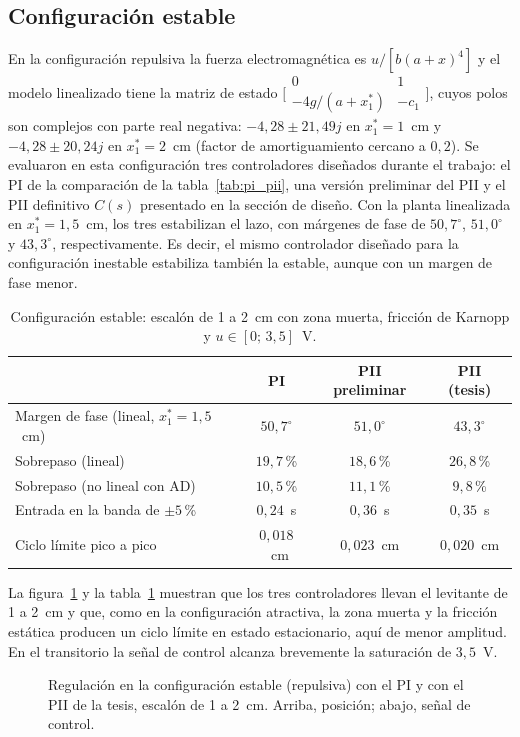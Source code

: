 \subsection{Configuración estable}

En la configuración repulsiva la fuerza electromagnética es $u/[b(a+x)^4]$ y el modelo linealizado tiene la matriz de estado $\bigl[\begin{smallmatrix}0&1\\-4g/(a+x_1^*)&-c_1\end{smallmatrix}\bigr]$, cuyos polos son complejos con parte real negativa: $-4{,}28\pm21{,}49j$ en $x_1^*=1$~cm y $-4{,}28\pm20{,}24j$ en $x_1^*=2$~cm (factor de amortiguamiento cercano a $0{,}2$). Se evaluaron en esta configuración tres controladores diseñados durante el trabajo: el PI de la comparación de la tabla~\ref{tab:pi_pii}, una versión preliminar del PII y el PII definitivo $C(s)$ presentado en la sección de diseño. Con la planta linealizada en $x_1^*=1{,}5$~cm, los tres estabilizan el lazo, con márgenes de fase de $50{,}7^\circ$, $51{,}0^\circ$ y $43{,}3^\circ$, respectivamente. Es decir, el mismo controlador diseñado para la configuración inestable estabiliza también la estable, aunque con un margen de fase menor.

\begin{table}[ht]
\centering
\caption{Configuración estable: escalón de 1 a 2~cm con zona muerta, fricción de Karnopp y $u\in[0;\,3{,}5]$~V.}
\label{tab:p8_estable}
\begin{tabular}{|l|c|c|c|}
\hline
 & PI & PII preliminar & PII (tesis) \\ \hline
Margen de fase (lineal, $x_1^*=1{,}5$~cm) & $50{,}7^\circ$ & $51{,}0^\circ$ & $43{,}3^\circ$ \\ \hline
Sobrepaso (lineal) & $19{,}7$\,\% & $18{,}6$\,\% & $26{,}8$\,\% \\ \hline
Sobrepaso (no lineal con AD) & $10{,}5$\,\% & $11{,}1$\,\% & $9{,}8$\,\% \\ \hline
Entrada en la banda de $\pm5$\,\% & $0{,}24$~s & $0{,}36$~s & $0{,}35$~s \\ \hline
Ciclo límite pico a pico & $0{,}018$~cm & $0{,}023$~cm & $0{,}020$~cm \\ \hline
\end{tabular}
\end{table}

La figura~\ref{fig:p8_estable} y la tabla~\ref{tab:p8_estable} muestran que los tres controladores llevan el levitante de 1 a 2~cm y que, como en la configuración atractiva, la zona muerta y la fricción estática producen un ciclo límite en estado estacionario, aquí de menor amplitud. En el transitorio la señal de control alcanza brevemente la saturación de $3{,}5$~V.

\begin{figure}[ht]
    \centering
    
    \caption[Configuración estable]{Regulación en la configuración estable (repulsiva) con el PI y con el PII de la tesis, escalón de 1 a 2~cm. Arriba, posición; abajo, señal de control.}
    \label{fig:p8_estable}
\end{figure}

\FloatBarrier
